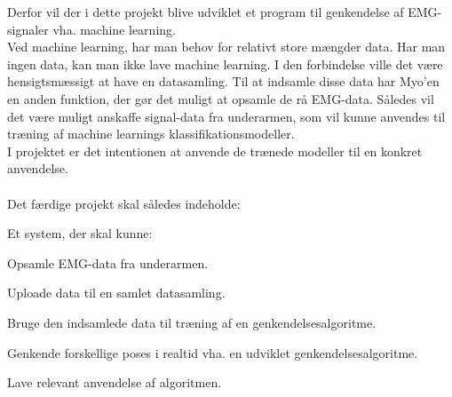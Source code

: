 Derfor vil der i dette projekt blive udviklet et program til genkendelse af EMG-signaler vha. machine learning. \\
Ved machine learning, har man behov for relativt store mængder data. Har man ingen data, kan man ikke lave machine learning. I den forbindelse ville det være hensigtsmæssigt at have en datasamling. Til at indsamle disse data har Myo'en en anden funktion, der gør det muligt at opsamle de rå EMG-data. Således vil det være muligt anskaffe signal-data fra underarmen, som vil kunne anvendes til træning af machine learnings klassifikationsmodeller. \\
I projektet er det intentionen at anvende de trænede modeller til en konkret anvendelse. \\\\
Det færdige projekt skal således indeholde:
\begin{myItemize}
\item Et system, der skal kunne:
	\begin{myItemize}
		\item Opsamle EMG-data fra underarmen.
		\item Uploade data til en samlet datasamling.
		\item Bruge den indsamlede data til træning af en genkendelsesalgoritme.
		\item Genkende forskellige poses i realtid vha. en udviklet genkendelsesalgoritme.
		\item Lave relevant anvendelse af algoritmen.
	\end{myItemize}
\end{myItemize}
